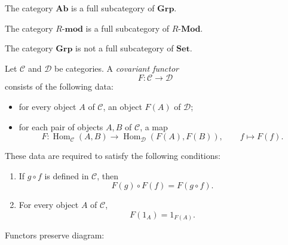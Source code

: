 \begin{example}
    The category $\mathbf{Ab}$ is a full subcategory of $\mathbf{Grp}$.

    The category $R\text{-}\mathbf{mod}$ is a full subcategory of $R\text{-}\mathbf{Mod}$.

    The category $\mathbf{Grp}$ is not a full subcategory of $\mathbf{Set}$.
\end{example}

\begin{definition}
    Let $\mathcal{C}$ and $\mathcal{D}$ be categories. A \emph{covariant functor}
    \[
        F:\mathcal{C}\to\mathcal{D}
    \]
    consists of the following data:
    \begin{itemize}
        \item for every object $A$ of $\mathcal{C}$, an object $F(A)$ of $\mathcal{D}$;
        \item for each pair of objects $A,B$ of $\mathcal{C}$, a map
              \[
                  F:\operatorname{Hom}_{\mathcal{C}}(A,B)\to \operatorname{Hom}_{\mathcal{D}}(F(A),F(B)),
                  \qquad
                  f\mapsto F(f).
              \]
    \end{itemize}
    These data are required to satisfy the following conditions:
    \begin{enumerate}
        \item If $g\circ f$ is defined in $\mathcal{C}$, then
              \[
                  F(g)\circ F(f)=F(g\circ f).
              \]
        \item For every object $A$ of $\mathcal{C}$,
              \[
                  F(1_A)=1_{F(A)}.
              \]
    \end{enumerate}
\end{definition}

\begin{proposition}
    Functors preserve diagram:
    \begin{center}
    \end{center}
\end{proposition}

